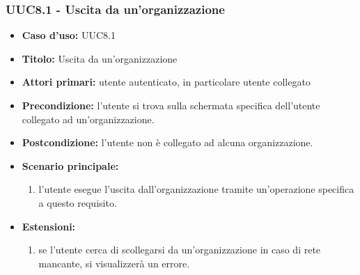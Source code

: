 \documentclass[casi-duso]{subfiles}
\begin{document}
\subsubsection{UUC8.1 - Uscita da un'organizzazione}
\label{subsub:UUC8.1utente}
\begin{itemize}
  \item \textbf{Caso d’uso:} UUC8.1
  \item \textbf{Titolo:} Uscita da un'organizzazione
  \item \textbf{Attori primari:} utente autenticato, in particolare utente collegato
  \item \textbf{Precondizione:} l'utente si trova sulla schermata specifica dell'utente collegato ad un'organizzazione.
  \item \textbf{Postcondizione:} l'utente non è collegato ad alcuna organizzazione.
  \item \textbf{Scenario principale:} 
  \begin{enumerate}
    \item l'utente esegue l'uscita dall'organizzazione tramite un'operazione specifica a questo requisito.
  \end{enumerate}  
  \item \textbf{Estensioni:} 
  \begin{enumerate}
    \item se l'utente cerca di scollegarsi da un'organizzazione in caso di rete mancante, si visualizzerà un errore.
  \end{enumerate}  
\end{itemize}

\end{document}
